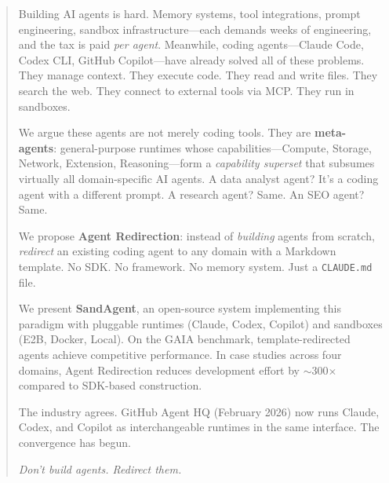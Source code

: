 \begin{abstract}

Building AI agents is hard. Memory systems, tool integrations, prompt engineering, sandbox infrastructure---each demands weeks of engineering, and the tax is paid \textit{per agent}. Meanwhile, coding agents---Claude Code, Codex CLI, GitHub Copilot---have already solved all of these problems. They manage context. They execute code. They read and write files. They search the web. They connect to external tools via MCP. They run in sandboxes.

We argue these agents are not merely coding tools. They are \textbf{meta-agents}: general-purpose runtimes whose capabilities---Compute, Storage, Network, Extension, Reasoning---form a \textit{capability superset} that subsumes virtually all domain-specific AI agents. A data analyst agent? It's a coding agent with a different prompt. A research agent? Same. An SEO agent? Same.

We propose \textbf{Agent Redirection}: instead of \textit{building} agents from scratch, \textit{redirect} an existing coding agent to any domain with a Markdown template. No SDK. No framework. No memory system. Just a \texttt{CLAUDE.md} file.

We present \textbf{SandAgent}, an open-source system implementing this paradigm with pluggable runtimes (Claude, Codex, Copilot) and sandboxes (E2B, Docker, Local). On the GAIA benchmark, template-redirected agents achieve competitive performance. In case studies across four domains, Agent Redirection reduces development effort by $\sim$300$\times$ compared to SDK-based construction.

The industry agrees. GitHub Agent HQ (February 2026) now runs Claude, Codex, and Copilot as interchangeable runtimes in the same interface. The convergence has begun.

\medskip
\noindent\textit{Don't build agents. Redirect them.}
\end{abstract}
